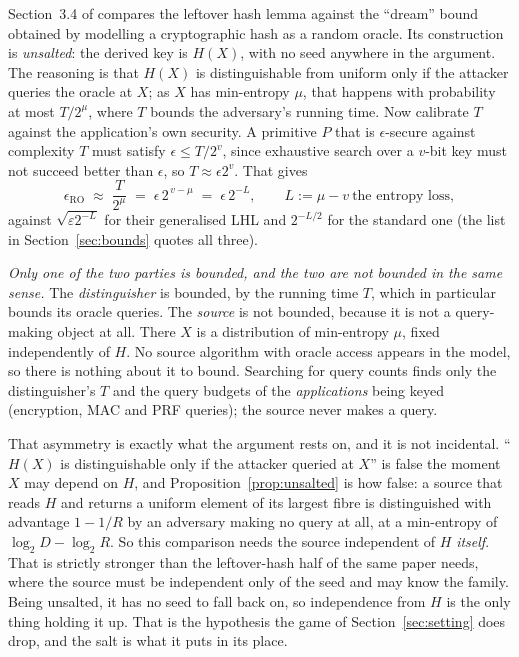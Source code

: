 \documentclass{aicr-solution}
\begin{document}
\begin{remark}\label{rem:roquery}
Section~3.4 of \cite{BDKPPSY11} compares the leftover hash lemma against the ``dream'' bound
obtained by modelling a cryptographic hash as a random oracle. Its construction is \emph{unsalted}:
the derived key is $H(X)$, with no seed anywhere in the argument. The reasoning is that $H(X)$ is
distinguishable from uniform only if the attacker queries the oracle at $X$; as $X$ has min-entropy
$\mu$, that happens with probability at most $T/2^{\mu}$, where $T$ bounds the adversary's running
time. Now calibrate $T$ against the application's own security. A primitive $P$ that is
$\epsilon$-secure against complexity $T$ must satisfy $\epsilon \le T/2^{v}$, since exhaustive
search over a $v$-bit key must not succeed better than $\epsilon$, so $T \approx \epsilon 2^{v}$.
That gives
\[
  \epsilon_{\mathrm{RO}} \;\approx\; \frac{T}{2^{\mu}} \;=\; \epsilon\,2^{\,v-\mu} \;=\;
  \epsilon\,2^{-L} , \qquad L := \mu - v \ \text{the entropy loss} ,
\]
against $\sqrt{\varepsilon 2^{-L}}$ for their generalised LHL and $2^{-L/2}$ for the standard one
(the list in Section~\ref{sec:bounds} quotes all three).

\emph{Only one of the two parties is bounded, and the two are not bounded in the same sense.} The
\emph{distinguisher} is bounded, by the running time $T$, which in particular bounds its oracle
queries. The \emph{source} is not bounded, because it is not a query-making object at all. There
$X$ is a distribution of min-entropy $\mu$, fixed independently of $H$. No source algorithm with
oracle access appears in the model, so there is nothing about it to bound. Searching
\cite{BDKPPSY11} for query counts finds only the distinguisher's $T$ and the query budgets of the
\emph{applications} being keyed (encryption, MAC and PRF queries); the source never makes a query.

That asymmetry is exactly what the argument rests on, and it is not incidental. ``$H(X)$ is
distinguishable only if the attacker queried at $X$'' is false the moment $X$ may depend on $H$, and
Proposition~\ref{prop:unsalted} is how false: a source that reads $H$ and returns a uniform element
of its largest fibre is distinguished with advantage $1 - 1/R$ by an adversary making no query at
all, at a min-entropy of $\log_2 D - \log_2 R$. So this comparison needs the source independent of
$H$ \emph{itself}. That is strictly stronger than the leftover-hash half of the same paper needs,
where the source must be independent only of the seed and may know the family. Being unsalted, it has no seed to fall back
on, so independence from $H$ is the only thing holding it up. That is the hypothesis
the game of Section~\ref{sec:setting} does drop, and the salt is what it puts in its place.


\end{remark}
\end{document}
